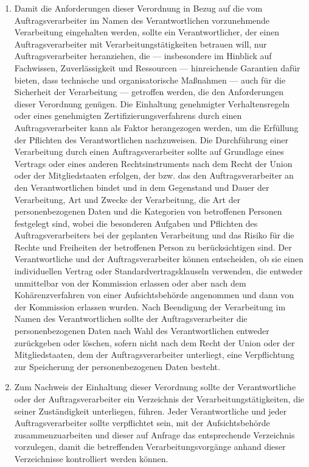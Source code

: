 \begin{enumerate}

   \item Damit die Anforderungen dieser Verordnung in Bezug auf die vom Auftragsverarbeiter im Namen des
    Verantwortlichen vorzunehmende Verarbeitung eingehalten werden, sollte ein Verantwortlicher, der einen
    Auftragsverarbeiter mit Verarbeitungstätigkeiten betrauen will, nur Auftragsverarbeiter heranziehen, die —
    insbesondere im Hinblick auf Fachwissen, Zuverlässigkeit und Ressourcen — hinreichende Garantien dafür bieten, dass
    technische und organisatorische Maßnahmen — auch für die Sicherheit der Verarbeitung — getroffen werden, die den
    Anforderungen dieser Verordnung genügen. Die Einhaltung genehmigter Verhaltensregeln oder eines genehmigten
    Zertifizierungsverfahrens durch einen Auftragsverarbeiter kann als Faktor herangezogen werden, um die Erfüllung der
    Pflichten des Verantwortlichen nachzuweisen. Die Durchführung einer Verarbeitung durch einen Auftragsverarbeiter
    sollte auf Grundlage eines Vertrags oder eines anderen Rechtsinstruments nach dem Recht der Union oder der
    Mitgliedstaaten erfolgen, der bzw. das den Auftragsverarbeiter an den Verantwortlichen bindet und in dem Gegenstand
    und Dauer der Verarbeitung, Art und Zwecke der Verarbeitung, die Art der personenbezogenen Daten und die Kategorien
    von betroffenen Personen festgelegt sind, wobei die besonderen Aufgaben und Pflichten des Auftragsverarbeiters bei
    der geplanten Verarbeitung und das Risiko für die Rechte und Freiheiten der betroffenen Person zu berücksichtigen
    sind. Der Verantwortliche und der Auftragsverarbeiter können entscheiden, ob sie einen individuellen Vertrag oder
    Standardvertragsklauseln verwenden, die entweder unmittelbar von der Kommission erlassen oder aber nach dem
    Kohärenzverfahren von einer Aufsichtsbehörde angenommen und dann von der Kommission erlassen wurden. Nach
    Beendigung der Verarbeitung im Namen des Verantwortlichen sollte der Auftragsverarbeiter die personenbezogenen
    Daten nach Wahl des Verantwortlichen entweder zurückgeben oder löschen, sofern nicht nach dem Recht der Union oder
    der Mitgliedstaaten, dem der Auftragsverarbeiter unterliegt, eine Verpflichtung zur Speicherung der
    personenbezogenen Daten besteht.%
   \label{itm:eg-81}
   

   \item Zum Nachweis der Einhaltung dieser Verordnung sollte der Verantwortliche oder der Auftragsverarbeiter ein
    Verzeichnis der Verarbeitungstätigkeiten, die seiner Zuständigkeit unterliegen, führen. Jeder Verantwortliche und
    jeder Auftragsverarbeiter sollte verpflichtet sein, mit der Aufsichtsbehörde zusammenzuarbeiten und dieser auf
    Anfrage das entsprechende Verzeichnis vorzulegen, damit die betreffenden Verarbeitungsvorgänge anhand dieser
    Verzeichnisse kontrolliert werden können.%
   \label{itm:eg-82}
   

\end{enumerate}
